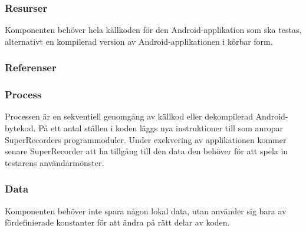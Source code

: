 \subsubsection{Resurser}
Komponenten behöver hela källkoden för den Android-applikation som ska testas, alternativt en kompilerad version av Android-applikationen i körbar form.

\subsubsection{Referenser}

\subsubsection{Process}
Processen är en sekventiell genomgång av källkod eller dekompilerad Android-bytekod. På ett antal ställen i koden läggs nya instruktioner till som anropar SuperRecorders programmoduler. Under exekvering av applikationen kommer senare SuperRecorder att ha tillgång till den data den behöver för att spela in testarens användarmönster.

\subsubsection{Data}
Komponenten behöver inte spara någon lokal data, utan använder sig bara av fördefinierade konstanter för att ändra på rätt delar av koden.
